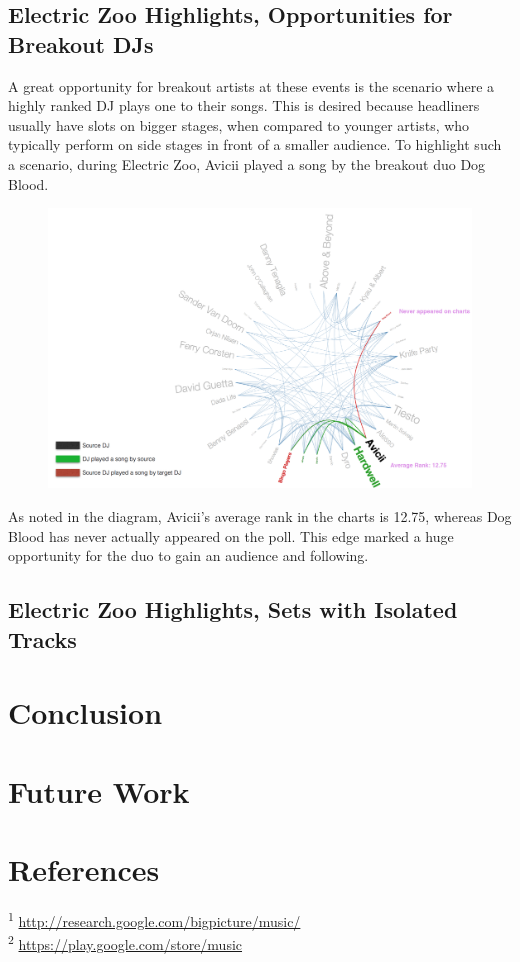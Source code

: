 \documentclass[12pt]{dalcsthesis}
\begin{document}
\section{Electric Zoo Highlights, Opportunities for Breakout DJs}

A great opportunity for breakout artists at these events is the scenario where a highly ranked DJ plays one to their songs. This is desired because headliners usually have slots on bigger stages, when compared to younger artists, who typically perform on side stages in front of a smaller audience. To highlight such a scenario, during Electric Zoo, Avicii played a song by the breakout duo Dog Blood. \newpage

\begin{figure}[h]
\includegraphics[scale=.5]{avicii_dog_blood}
\centering
\end{figure}

As noted in the diagram, Avicii's average rank in the charts is 12.75, whereas Dog Blood has never actually appeared on the poll. This edge marked a huge opportunity for the duo to gain an audience and following.

\section{Electric Zoo Highlights, Sets with Isolated Tracks}



\chapter{Conclusion}
\chapter{Future Work}
\chapter{References}

\textsuperscript{1} \url{http://research.google.com/bigpicture/music/} \\
\textsuperscript{2} \url{https://play.google.com/store/music}



\end{document}
